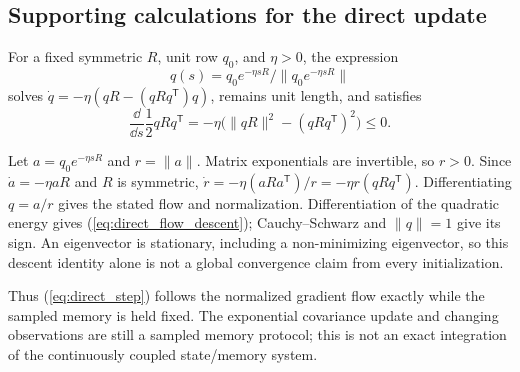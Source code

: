 \subsection{Supporting calculations for the direct update}
\begin{directproposition}
\label{prop:direct_exact_flow}
For a fixed symmetric $R$, unit row $q_0$, and $\eta>0$, the expression
\begin{equation}
 q(s)=q_0e^{-\eta sR}/\|q_0e^{-\eta sR}\|
 \label{eq:direct_flow_solution}
\end{equation}
solves $\dot q=-\eta(qR-(qRq^{\mathsf T})q)$, remains unit length, and
satisfies
\begin{equation}
 \frac{\dd}{\dd s}\frac12qRq^{\mathsf T}
 =-\eta\bigl(\|qR\|^2-(qRq^{\mathsf T})^2\bigr)\le0.
 \label{eq:direct_flow_descent}
\end{equation}
\end{directproposition}
\begin{IEEEproof}
Let $a=q_0e^{-\eta sR}$ and $r=\|a\|$. Matrix exponentials are
invertible, so $r>0$. Since $\dot a=-\eta aR$ and $R$ is symmetric,
$\dot r=-\eta(aRa^{\mathsf T})/r=-\eta r(qRq^{\mathsf T})$.
Differentiating $q=a/r$ gives the stated flow and normalization.
Differentiation of the quadratic energy gives
(\ref{eq:direct_flow_descent}); Cauchy--Schwarz and $\|q\|=1$ give its
sign. An eigenvector is stationary, including a non-minimizing
eigenvector, so this descent identity alone is not a global convergence
claim from every initialization.
\end{IEEEproof}
Thus (\ref{eq:direct_step}) follows the normalized gradient flow exactly
while the sampled memory is held fixed. The exponential covariance update
and changing observations are still a sampled memory protocol; this is
not an exact integration of the continuously coupled state/memory system.

